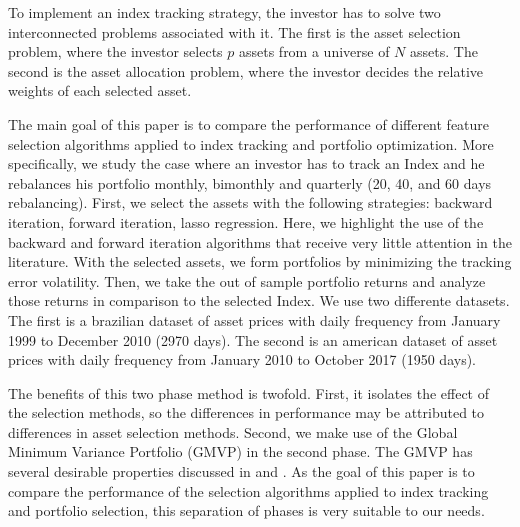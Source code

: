 \documentclass[preprint,authoryear,review,12pt]{elsarticle}
\begin{document}
To implement an index tracking strategy, the investor has to solve two interconnected problems associated with it.
The first is the asset selection problem, where the investor selects $p$ assets from a universe of $N$ assets.
The second is the asset allocation problem, where the investor decides the relative weights of each selected asset.


The main goal of this paper is to compare the performance of different feature selection algorithms applied to index tracking and portfolio optimization.
More specifically, we study the case where an investor has to track an Index and he rebalances his portfolio monthly, bimonthly and quarterly (20, 40, and 60 days rebalancing).
First, we select the assets with the following strategies:
backward iteration, forward iteration, lasso regression.
Here, we highlight the use of the backward and forward iteration algorithms that receive very little attention in the literature.
With the selected assets, we form portfolios by minimizing the tracking error volatility.
Then, we take the out of sample portfolio returns and analyze those returns in comparison to the selected Index.
We use two differente datasets.
The first is a brazilian dataset of asset prices with daily frequency from January 1999 to December 2010 (2970 days).
The second is an american dataset of asset prices with daily frequency from January 2010 to October 2017 (1950 days).

The benefits of this two phase method is twofold.
First, it isolates the effect of the selection methods, so the differences in performance may be attributed to differences in asset selection methods.
Second, we make use of the Global Minimum Variance Portfolio (GMVP) in the second phase.
The GMVP has several desirable properties discussed in \cite{jag-2003} and \cite{CTS2006}.
As the goal of this paper is to compare the performance of the selection algorithms applied to index tracking and portfolio selection, this separation of phases is very suitable to our needs.

\end{document}
